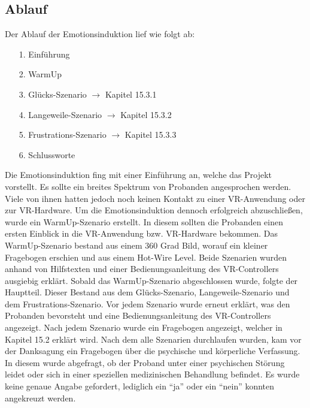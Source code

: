 \subsection{Ablauf} \label{ablauf-subsubsec}




Der Ablauf der Emotionsinduktion lief wie folgt ab:


\begin{itemize}
\item[1.] Einf{\"u}hrung
\item[2.] WarmUp
\item[3.] Gl{\"u}cks-Szenario $\rightarrow$ Kapitel 15.3.1
\item[4.] Langeweile-Szenario $\rightarrow$ Kapitel 15.3.2
\item[5.] Frustrations-Szenario $\rightarrow$ Kapitel 15.3.3
\item[6.] Schlussworte
\end{itemize}


Die Emotionsinduktion fing mit einer Einf{\"u}hrung an, welche das Projekt vorstellt.
Es sollte ein breites Spektrum von Probanden angesprochen werden. 
Viele von ihnen hatten jedoch noch keinen Kontakt zu einer VR-Anwendung oder zur VR-Hardware. 
Um die Emotionsinduktion dennoch erfolgreich abzuschlie{\ss}en, wurde ein WarmUp-Szenario erstellt. 
In diesem sollten die Probanden einen ersten Einblick in die VR-Anwendung bzw. VR-Hardware bekommen. 
Das WarmUp-Szenario bestand aus einem 360 Grad Bild, worauf ein kleiner Fragebogen erschien und aus einem Hot-Wire Level. 
Beide Szenarien wurden anhand von Hilfstexten und einer Bedienungsanleitung des VR-Controllers ausgiebig erkl{\"a}rt.
Sobald das WarmUp-Szenario abgeschlossen wurde, folgte der Hauptteil. 
Dieser Bestand aus dem Gl{\"u}cks-Szenario, Langeweile-Szenario und dem Frustrations-Szenario. 
Vor jedem Szenario wurde erneut erkl{\"a}rt, was den Probanden bevorsteht und eine Bedienungsanleitung des VR-Controllers angezeigt. 
Nach jedem Szenario wurde ein Fragebogen angezeigt, welcher in Kapitel 15.2 erkl{\"a}rt wird. 
Nach dem alle Szenarien durchlaufen wurden, kam vor der Danksagung ein Fragebogen {\"u}ber die psychische und k{\"o}rperliche Verfassung. 
In diesem wurde abgefragt, ob der Proband unter einer psychischen St{\"o}rung leidet oder sich in einer speziellen medizinischen Behandlung befindet. 
Es wurde keine genaue Angabe gefordert, lediglich ein ``ja'' oder ein ``nein'' konnten angekreuzt werden.
